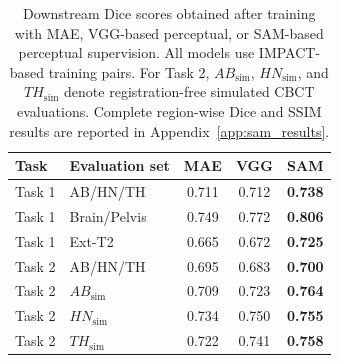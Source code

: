 \begin{table}[h!]
\centering
\small
\setlength{\tabcolsep}{5pt}
\renewcommand{\arraystretch}{1.15}
\caption{Downstream Dice scores obtained after training with MAE, VGG-based perceptual, or SAM-based perceptual supervision. All models use IMPACT-based training pairs. For Task 2, $AB_{\mathrm{sim}}$, $HN_{\mathrm{sim}}$, and $TH_{\mathrm{sim}}$ denote registration-free simulated CBCT evaluations. Complete region-wise Dice and SSIM results are reported in Appendix~\ref{app:sam_results}.}
\label{tab:sam_dice_compact}
\begin{tabular}{llccc}
\toprule
Task & Evaluation set & MAE & VGG & SAM \\
\midrule
Task 1 & AB/HN/TH & 0.711 & 0.712 & \textbf{0.738} \\
Task 1 & Brain/Pelvis & 0.749 & 0.772 & \textbf{0.806} \\
Task 1 & Ext-T2 & 0.665 & 0.672 & \textbf{0.725} \\
\midrule
Task 2 & AB/HN/TH & 0.695 & 0.683 & \textbf{0.700} \\
Task 2 & $AB_{\mathrm{sim}}$ & 0.709 & 0.723 & \textbf{0.764} \\
Task 2 & $HN_{\mathrm{sim}}$ & 0.734 & 0.750 & \textbf{0.755} \\
Task 2 & $TH_{\mathrm{sim}}$ & 0.722 & 0.741 & \textbf{0.758} \\
\bottomrule
\end{tabular}

\end{table}
